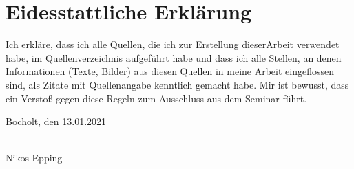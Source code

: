 \section{Eidesstattliche Erklärung}
Ich erkläre, dass ich alle Quellen, die ich zur Erstellung dieserArbeit verwendet habe, im Quellenverzeichnis aufgeführt habe und dass ich alle Stellen, an denen Informationen (Texte, Bilder) aus diesen Quellen in meine Arbeit eingeflossen sind, als Zitate mit Quellenangabe kenntlich gemacht habe.
Mir ist bewusst, dass ein Verstoß gegen diese Regeln zum Ausschluss aus dem Seminar führt.

\vspace{1.5cm}

\small
Bocholt, den 13.01.2021

\vspace{0.8cm}

--------------------------------------------------------\\
Nikos Epping